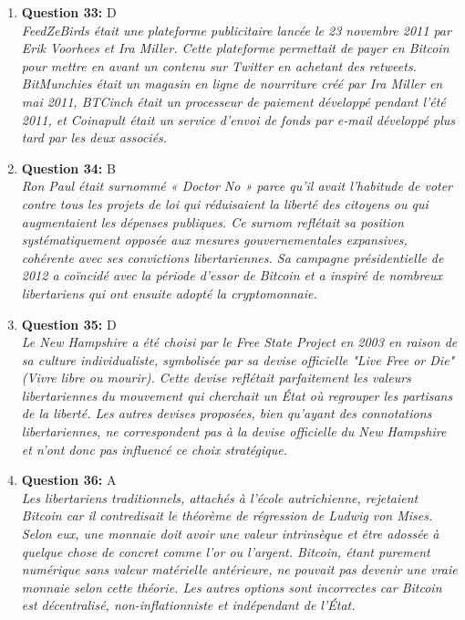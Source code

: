 \documentclass[12pt,a4paper]{article}
\begin{document}
\begin{enumerate}
\item \textbf{Question 33:} D
\\ \textit{FeedZeBirds était une plateforme publicitaire lancée le 23 novembre 2011 par Erik Voorhees et Ira Miller. Cette plateforme permettait de payer en Bitcoin pour mettre en avant un contenu sur Twitter en achetant des retweets. BitMunchies était un magasin en ligne de nourriture créé par Ira Miller en mai 2011, BTCinch était un processeur de paiement développé pendant l'été 2011, et Coinapult était un service d'envoi de fonds par e-mail développé plus tard par les deux associés.}

\item \textbf{Question 34:} B
\\ \textit{Ron Paul était surnommé « Doctor No » parce qu'il avait l'habitude de voter contre tous les projets de loi qui réduisaient la liberté des citoyens ou qui augmentaient les dépenses publiques. Ce surnom reflétait sa position systématiquement opposée aux mesures gouvernementales expansives, cohérente avec ses convictions libertariennes. Sa campagne présidentielle de 2012 a coïncidé avec la période d'essor de Bitcoin et a inspiré de nombreux libertariens qui ont ensuite adopté la cryptomonnaie.}

\item \textbf{Question 35:} D
\\ \textit{Le New Hampshire a été choisi par le Free State Project en 2003 en raison de sa culture individualiste, symbolisée par sa devise officielle "Live Free or Die" (Vivre libre ou mourir). Cette devise reflétait parfaitement les valeurs libertariennes du mouvement qui cherchait un État où regrouper les partisans de la liberté. Les autres devises proposées, bien qu'ayant des connotations libertariennes, ne correspondent pas à la devise officielle du New Hampshire et n'ont donc pas influencé ce choix stratégique.}

\item \textbf{Question 36:} A
\\ \textit{Les libertariens traditionnels, attachés à l'école autrichienne, rejetaient Bitcoin car il contredisait le théorème de régression de Ludwig von Mises. Selon eux, une monnaie doit avoir une valeur intrinsèque et être adossée à quelque chose de concret comme l'or ou l'argent. Bitcoin, étant purement numérique sans valeur matérielle antérieure, ne pouvait pas devenir une vraie monnaie selon cette théorie. Les autres options sont incorrectes car Bitcoin est décentralisé, non-inflationniste et indépendant de l'État.}


\end{enumerate}
\end{document}
